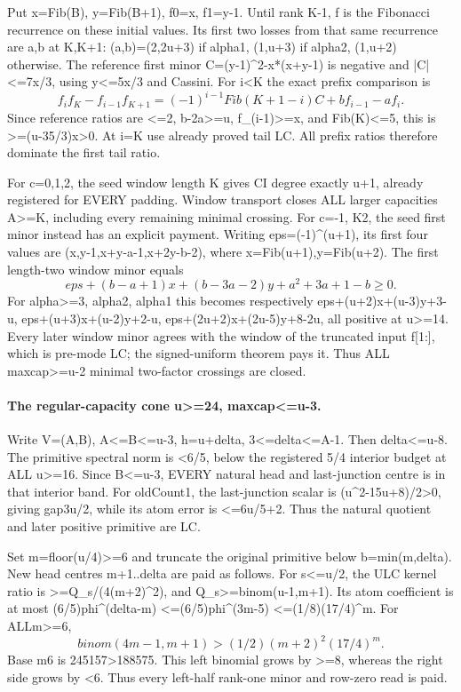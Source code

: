 Put x=Fib(B), y=Fib(B+1), f0=x, f1=y-1. Until rank K-1, f is the
Fibonacci recurrence on these initial values. Its first two losses
from that same recurrence are a,b at K,K+1:
(a,b)=(2,2u+3) if alpha1, (1,u+3) if alpha2, (1,u+2) otherwise.
The reference first minor C=(y-1)^2-x*(x+y-1) is negative and
|C|<=7x/3, using y<=5x/3 and Cassini.
For i<K the exact prefix comparison is
\[
 f_i f_K-f_{i-1}f_{K+1}
   =(-1)^{i-1}Fib(K+1-i)C+b f_{i-1}-a f_i.
\]
Since reference ratios are <=2, b-2a>=u, f_(i-1)>=x, and
Fib(K)<=5, this is >=(u-35/3)x>0. At i=K use already proved tail LC.
All prefix ratios therefore dominate the first tail ratio.

For c=0,1,2, the seed window length K gives CI degree exactly u+1,
already registered for EVERY padding. Window transport closes ALL
larger capacities A>=K, including every remaining minimal crossing.
For c=-1, K2, the seed first minor instead has an explicit payment.
Writing eps=(-1)^(u+1), its first four values are
(x,y-1,x+y-a-1,x+2y-b-2), where x=Fib(u+1),y=Fib(u+2).
The first length-two window minor equals
\[
 eps+(b-a+1)x+(b-3a-2)y+a^2+3a+1-b\ge0.
\]
For alpha>=3, alpha2, alpha1 this becomes respectively
eps+(u+2)x+(u-3)y+3-u,
eps+(u+3)x+(u-2)y+2-u,
eps+(2u+2)x+(2u-5)y+8-2u, all positive at u>=14.
Every later window minor agrees with the window of the truncated
input f[1:], which is pre-mode LC; the signed-uniform theorem pays it.
Thus ALL maxcap>=u-2 minimal two-factor crossings are closed.

\paragraph{The regular-capacity cone u>=24, maxcap<=u-3.}
Write V=(A,B), A<=B<=u-3, h=u+delta, 3<=delta<=A-1.
Then delta<=u-8. The primitive spectral norm is <6/5, below the
registered 5/4 interior budget at ALL u>=16. Since B<=u-3, EVERY
natural head and last-junction centre is in that interior band.
For oldCount1, the last-junction scalar is (u^2-15u+8)/2>0,
giving gap3u/2, while its atom error is <=6u/5+2.
Thus the natural quotient and later positive primitive are LC.

Set m=floor(u/4)>=6 and truncate the original primitive below
b=min(m,delta). New head centres m+1..delta are paid as follows.
For s<=u/2, the ULC kernel ratio is >=Q_s/(4(m+2)^2), and
Q_s>=binom(u-1,m+1). Its atom coefficient is at most
(6/5)phi^(delta-m) <=(6/5)phi^(3m-5)
 <=(1/8)(17/4)^m.
For ALLm>=6,
\[
 binom(4m-1,m+1)>(1/2)(m+2)^2(17/4)^m.
\]
Base m6 is 245157>188575. This left binomial grows by >=8,
whereas the right side grows by <6. Thus every left-half rank-one
minor and row-zero read is paid.

